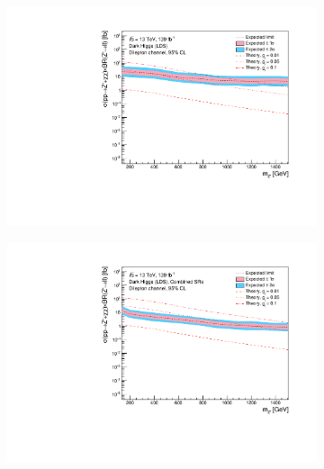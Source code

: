 \documentclass[12pt, a4paper]{book}
\begin{document}
\begin{figure}[!ht]
	\centering
	\begin{subfigure}[b]{0.49\textwidth}
      \centering
      \includegraphics[width=1\textwidth]{Limits/DH_LDS/mass_exclusion_comb.pdf}
   \end{subfigure}
   \hfill
   \begin{subfigure}[b]{0.49\textwidth}
      \centering
      \includegraphics[width=1\textwidth]{Limits/Model_independent/DH_LDS/mass_exclusion_comb.pdf}
   \end{subfigure}
   \hfill
   \begin{subfigure}[b]{0.49\textwidth}
      \centering

\end{subfigure}
\end{figure}
\end{document}
